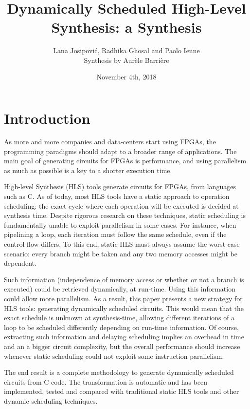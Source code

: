 \documentclass{article}
\title{Dynamically Scheduled High-Level Synthesis: a Synthesis}
\author{Lana Josipovi\'c, Radhika Ghosal and Paolo Ienne\\ Synthesis by Aur\`ele Barri\`ere}
\date{November 4th, 2018}
\begin{document}
\maketitle

\section{Introduction}
As more and more companies and data-centers start using FPGAs, the programming paradigms should adapt to a broader range of applications.
The main goal of generating circuits for FPGAs is performance, and using parallelism as much as possible is a key to a shorter execution time.

High-level Synthesis (HLS) tools generate circuits for FPGAs, from languages such as C.
As of today, most HLS tools have a static approach to operation scheduling: the exact cycle where each operation will be executed is decided at synthesis time.
Despite rigorous research on these techniques, static scheduling is fundamentally unable to exploit parallelism in some cases.
For instance, when pipelining a loop, each iteration must follow the same schedule, even if the control-flow differs. To this end, static HLS must always assume the worst-case scenario: every branch might be taken and any two memory accesses might be dependent.

Such information (independence of memory access or whether or not a branch is executed) could be retrieved dynamically, at run-time. Using this information could allow more parallelism.
As a result, this paper presents a new strategy for HLS tools: generating dynamically scheduled circuits.
This would mean that the exact schedule is unknown at synthesis-time, allowing different iterations of a loop to be scheduled differently depending on run-time information.
Of course, extracting such information and delaying scheduling implies an overhead in time and an a bigger circuit complexity, but the overall performance should increase whenever static scheduling could not exploit some instruction parallelism.

The end result is a complete methodology to generate dynamically scheduled circuits from C code. The transformation is automatic and has been implemented, tested and compared with traditional static HLS tools and other dynamic scheduling techniques.
\end{document}
